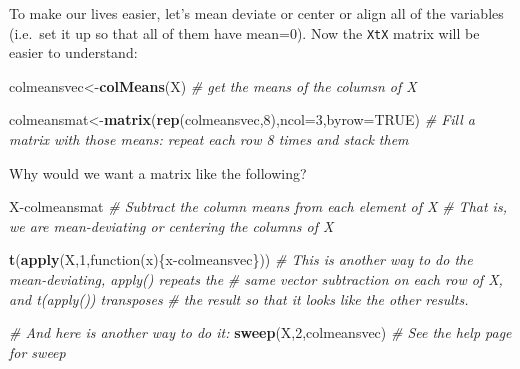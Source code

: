 \documentclass[10pt,]{article}
\newenvironment{Shaded}{\begin{snugshade}}{\end{snugshade}}
\newcommand{\KeywordTok}[1]{\textcolor[rgb]{0.13,0.29,0.53}{\textbf{{#1}}}}
\newcommand{\DataTypeTok}[1]{\textcolor[rgb]{0.13,0.29,0.53}{{#1}}}
\newcommand{\DecValTok}[1]{\textcolor[rgb]{0.00,0.00,0.81}{{#1}}}
\newcommand{\StringTok}[1]{\textcolor[rgb]{0.31,0.60,0.02}{{#1}}}
\newcommand{\CommentTok}[1]{\textcolor[rgb]{0.56,0.35,0.01}{\textit{{#1}}}}
\newcommand{\OtherTok}[1]{\textcolor[rgb]{0.56,0.35,0.01}{{#1}}}
\newcommand{\NormalTok}[1]{{#1}}
\begin{document}
\begin{Shaded}
\end{Shaded}

\begin{Shaded}
\end{Shaded}

To make our lives easier, let's mean deviate or center or align all of
the variables (i.e.~set it up so that all of them have mean=0). Now the
\texttt{XtX} matrix will be easier to understand:

\begin{Shaded}
\begin{Highlighting}[]
\NormalTok{colmeansvec<-}\KeywordTok{colMeans}\NormalTok{(X)  }\CommentTok{# get the means of the columsn of X}

\NormalTok{colmeansmat<-}\KeywordTok{matrix}\NormalTok{(}\KeywordTok{rep}\NormalTok{(colmeansvec,}\DecValTok{8}\NormalTok{),}\DataTypeTok{ncol=}\DecValTok{3}\NormalTok{,}\DataTypeTok{byrow=}\OtherTok{TRUE}\NormalTok{)}
\CommentTok{# Fill a matrix with those means: repeat each row 8 times and stack them}
\end{Highlighting}
\end{Shaded}

Why would we want a matrix like the following?

\begin{Shaded}
\begin{Highlighting}[]
\NormalTok{X-colmeansmat}
\CommentTok{# Subtract the column means from each element of X}
\CommentTok{# That is, we are mean-deviating or centering the columns of X}

\KeywordTok{t}\NormalTok{(}\KeywordTok{apply}\NormalTok{(X,}\DecValTok{1}\NormalTok{,function(x)\{x-colmeansvec\}))}
\CommentTok{# This is another way to do the mean-deviating, apply() repeats the}
\CommentTok{# same vector subtraction on each row of X, and t(apply()) transposes}
\CommentTok{# the result so that it looks like the other results.}

\CommentTok{# And here is another way to do it:}
\KeywordTok{sweep}\NormalTok{(X,}\DecValTok{2}\NormalTok{,colmeansvec)  }\CommentTok{# See the help page for sweep}
\end{Highlighting}
\end{Shaded}
\end{document}
